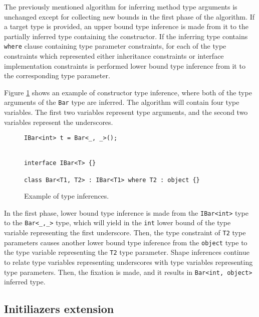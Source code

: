 The previously mentioned algorithm for inferring method type arguments is unchanged except for collecting new bounds in the first phase of the algorithm. 
If a target type is provided, an upper bound type inference is made from it to the partially inferred type containing the constructor. 
If the inferring type contains \texttt{where} clause containing type parameter constraints, for each of the type constraints which represented either inheritance constraints or interface implementation constraints is performed lower bound type inference from it to the corresponding type parameter.
\par
Figure \ref{img62:ctro} shows an example of constructor type inference, where both of the type arguments of the \texttt{Bar} type are inferred. 
The algorithm will contain four type variables. 
The first two variables represent type arguments, and the second two variables represent the underscores.
\begin{figure}[h!]
\begin{lstlisting}[style=csharp, mathescape=true]
IBar<int> t = Bar<_, _>();


interface IBar<T> {}

class Bar<T1, T2> : IBar<T1> where T2 : object {}
\end{lstlisting}
\caption{Example of type inferences.}
\label{img62:ctro}
\end{figure}
In the first phase, lower bound type inference is made from the \texttt{IBar<int>} type to the \texttt{Bar<\_,\_>} type, which will yield in the \texttt{int} lower bound of the type variable representing the first underscore. 
Then, the type constraint of \texttt{T2} type parameters causes another lower bound type inference from the \texttt{object} type to the type variable representing the \texttt{T2} type parameter. 
Shape inferences continue to relate type variables representing underscores with type variables representing type parameters. 
Then, the fixation is made, and it results in \texttt{Bar<int, object>} inferred type.

\subsection{Initiliazers extension} \label{sect12:ex1}

